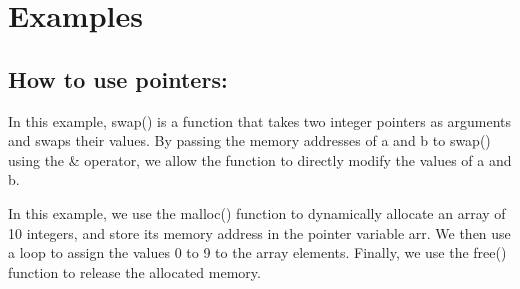 \documentclass[12pt, letterpaper]{report}
\begin{document}
\newpage
\section{Examples}

\subsection{How to use pointers:}

	
In this example, swap() is a function that takes two integer pointers as 
arguments and swaps their values. By passing the memory addresses of a and b 
to swap() using the \& operator, we allow the function to directly modify the 
values of a and b.

\clearpage
	
In this example, we use the malloc() function to dynamically allocate an array 
of 10 integers, and store its memory address in the pointer variable arr. We 
then use a loop to assign the values 0 to 9 to the array elements. Finally, we
use the free() function to release the allocated memory.
\end{document}
